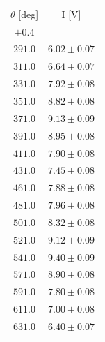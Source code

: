 \documentclass[10pt,oneside,a4paper]{article}
\begin{document}
\begin{table}[H]
\centering
{}
\label{tab:polarizzazione}
\begin{tabular}{cc}
\hline
 $\theta$ [deg]& I [V]\\
 $\pm 0.4$ & \\
\hline
  $291.0 $ & $ 6.02 \pm  0.07 $ \\
  $311.0 $ & $ 6.64 \pm  0.07 $ \\
  $331.0 $ & $ 7.92 \pm  0.08 $ \\
  $351.0 $ & $ 8.82 \pm  0.08 $ \\
  $371.0 $ & $ 9.13 \pm  0.09 $ \\
  $391.0 $ & $ 8.95 \pm  0.08 $ \\
  $411.0 $ & $ 7.90\pm  0.08 $ \\
  $431.0 $ & $ 7.45 \pm  0.08 $ \\
  $461.0 $ & $ 7.88 \pm  0.08 $ \\
  $481.0 $ & $ 7.96 \pm  0.08 $ \\
  $501.0 $ & $ 8.32 \pm  0.08 $ \\
  $521.0 $ & $ 9.12\pm  0.09 $ \\
  $541.0 $ & $ 9.40 \pm  0.09 $ \\
  $571.0 $ & $ 8.90 \pm  0.08 $ \\
  $ 591.0$ & $ 7.80 \pm  0.08 $  \\
 $611.0$ & $7.00 \pm0.08 $\\
 $631.0$ & $6.40 \pm0.07 $\\
\hline
\end{tabular}
\end{table}
\end{document}
